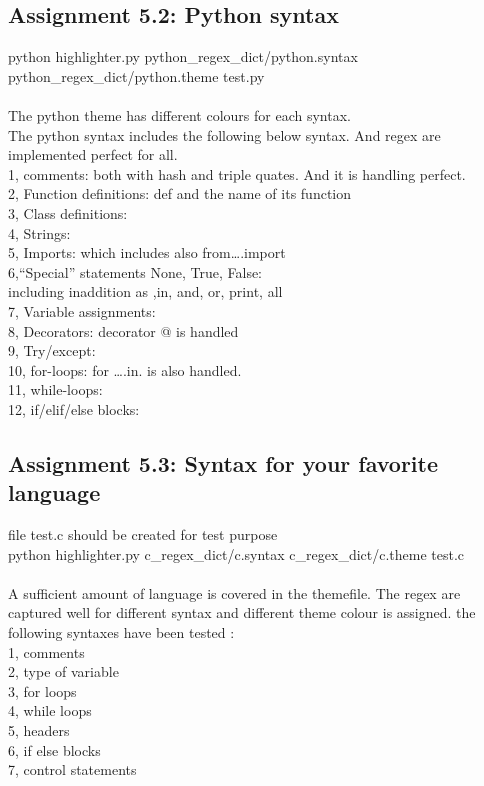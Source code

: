 \documentclass[a4paper]{article}
\begin{document}
\subsection*{Assignment 5.2: Python syntax} \label{sec:assignment5.2}
python highlighter.py python\_regex\_dict/python.syntax python\_regex\_dict/python.theme test.py \\
\\
The python theme has different colours for each syntax.\\
The python syntax includes the following below syntax. And regex are implemented perfect for all. \\
1, comments: 
     both with hash and triple quates. And it is handling perfect.\\
2, Function definitions:
     def and the name of its function \\
3, Class definitions:\\
4, Strings:\\
5, Imports:
    which includes also  from….import\\
6,“Special” statements None, True, False:\\
     including inaddition as ,in, and, or, print, all\\
7, Variable assignments:\\
8, Decorators:
    decorator @ is handled \\
9, Try/except:\\
10, for-loops:
    for ….in. is also  handled.\\
11, while-loops:\\
12, if/elif/else blocks:\\




\subsection*{Assignment 5.3: Syntax for your favorite language}
file test.c should be created for test purpose \\
python highlighter.py c\_regex\_dict/c.syntax c\_regex\_dict/c.theme test.c\\
\\
A sufficient amount of language is covered in the themefile. The regex are captured well for different syntax and different theme colour is assigned.
the following syntaxes have been tested :\\
1, comments\\
2, type of variable\\
3, for loops\\
4, while loops\\
5, headers\\
6, if else blocks\\
7, control statements\\
\end{document}
